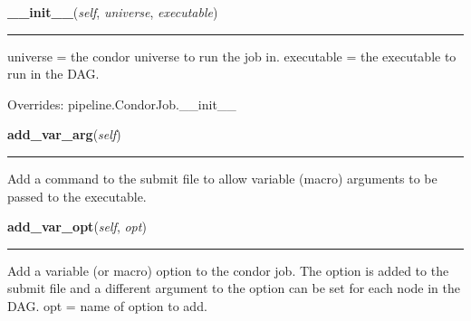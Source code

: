     \noindent\begin{boxedminipage}{\textwidth}

    \raggedright \textbf{\_\_init\_\_}(\textit{self}, \textit{universe}, \textit{executable})

    \vspace{-1.5ex}

    \rule{\textwidth}{0.5\fboxrule}
    universe = the condor universe to run the job in. executable = the 
    executable to run in the DAG.

    \vspace{1ex}

      Overrides: pipeline.CondorJob.\_\_init\_\_

    \end{boxedminipage}

    \label{pipeline:CondorDAGJob:add_var_arg}
    \vspace{0.5ex}

    \noindent\begin{boxedminipage}{\textwidth}

    \raggedright \textbf{add\_var\_arg}(\textit{self})

    \vspace{-1.5ex}

    \rule{\textwidth}{0.5\fboxrule}
    Add a command to the submit file to allow variable (macro) arguments 
    to be passed to the executable.

    \vspace{1ex}

    \end{boxedminipage}

    \label{pipeline:CondorDAGJob:add_var_opt}
    \vspace{0.5ex}

    \noindent\begin{boxedminipage}{\textwidth}

    \raggedright \textbf{add\_var\_opt}(\textit{self}, \textit{opt})

    \vspace{-1.5ex}

    \rule{\textwidth}{0.5\fboxrule}
    Add a variable (or macro) option to the condor job. The option is 
    added to the submit file and a different argument to the option can 
    be set for each node in the DAG. opt = name of option to add.

    \vspace{1ex}

    \end{boxedminipage}

